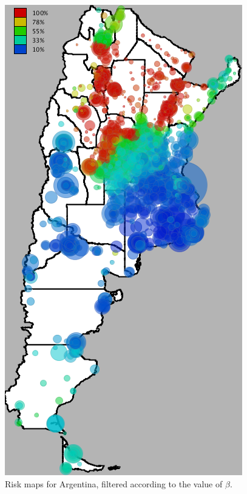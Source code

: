 \begin{figure}[ht]
	\caption{Risk maps for Argentina, filtered according to the value of $\beta$.}\label{fig:mapa_argentina}
	\begin{minipage}{.495\linewidth}
		\centering
		\includegraphics[width=0.90\linewidth]
		{figures/201112_hi_res_argentina_usuarios_proporcion_circulos_beta1/201112_hi_res_argentina_usuarios_proporcion_circulos_beta1}


\end{minipage}
\end{figure}
